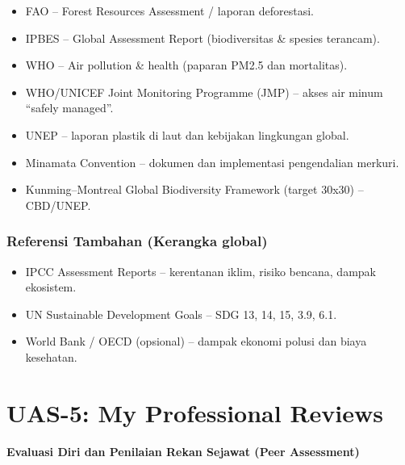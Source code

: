 \documentclass[
  letterpaper,
  DIV=11,
  numbers=noendperiod]{scrreprt}
\providecommand{\tightlist}{%
  \setlength{\itemsep}{0pt}\setlength{\parskip}{0pt}}
\begin{document}
\begin{itemize}
\tightlist
\item
  FAO -- Forest Resources Assessment / laporan deforestasi.\\
\item
  IPBES -- Global Assessment Report (biodiversitas \& spesies
  terancam).\\
\item
  WHO -- Air pollution \& health (paparan PM2.5 dan mortalitas).\\
\item
  WHO/UNICEF Joint Monitoring Programme (JMP) -- akses air minum
  ``safely managed''.\\
\item
  UNEP -- laporan plastik di laut dan kebijakan lingkungan global.\\
\item
  Minamata Convention -- dokumen dan implementasi pengendalian
  merkuri.\\
\item
  Kunming--Montreal Global Biodiversity Framework (target 30x30) --
  CBD/UNEP.
\end{itemize}

\subsection{Referensi Tambahan (Kerangka
global)}\label{referensi-tambahan-kerangka-global}

\begin{itemize}
\tightlist
\item
  IPCC Assessment Reports -- kerentanan iklim, risiko bencana, dampak
  ekosistem.\\
\item
  UN Sustainable Development Goals -- SDG 13, 14, 15, 3.9, 6.1.\\
\item
  World Bank / OECD (opsional) -- dampak ekonomi polusi dan biaya
  kesehatan.
\end{itemize}


\chapter{UAS-5: My Professional
Reviews}\label{uas-5-my-professional-reviews}

\textbf{Evaluasi Diri dan Penilaian Rekan Sejawat (Peer Assessment)}
\end{document}
